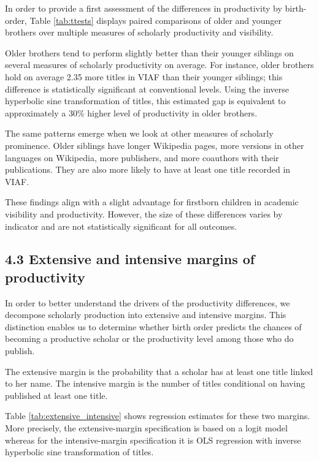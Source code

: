 In order to provide a first assessment of the differences in productivity by birth-order, Table \ref{tab:ttests} displays paired comparisons of older and younger brothers over multiple measures of scholarly productivity and visibility.

Older brothers tend to perform slightly better than their younger siblings on several measures of scholarly productivity on average. For instance, older brothers hold on average 2.35 more titles in VIAF than their younger siblings; this difference is statistically significant at conventional levels. Using the inverse hyperbolic sine transformation of titles, this estimated gap is equivalent to approximately a 30\% higher level of productivity in older brothers.

The same patterns emerge when we look at other measures of scholarly prominence. Older siblings have longer Wikipedia pages, more versions in other languages on Wikipedia, more publishers, and more coauthors with their publications. They are also more likely to have at least one title recorded in VIAF.

These findings align with a slight advantage for firstborn children in academic visibility and productivity. However, the size of these differences varies by indicator and are not statistically significant for all outcomes.


\FloatBarrier

\subsection*{4.3 Extensive and intensive margins of productivity}

In order to better understand the drivers of the productivity differences, we decompose scholarly production into extensive and intensive margins. This distinction enables us to determine whether birth order predicts the chances of becoming a productive scholar or the productivity level among those who do publish.

The extensive margin is the probability that a scholar has at least one title linked to her name. The intensive margin is the number of titles conditional on having published at least one title.

Table \ref{tab:extensive_intensive} shows regression estimates for these two margins. More precisely, the extensive-margin specification is based on a logit model whereas for the intensive-margin specification it is OLS regression with inverse hyperbolic sine transformation of titles.

